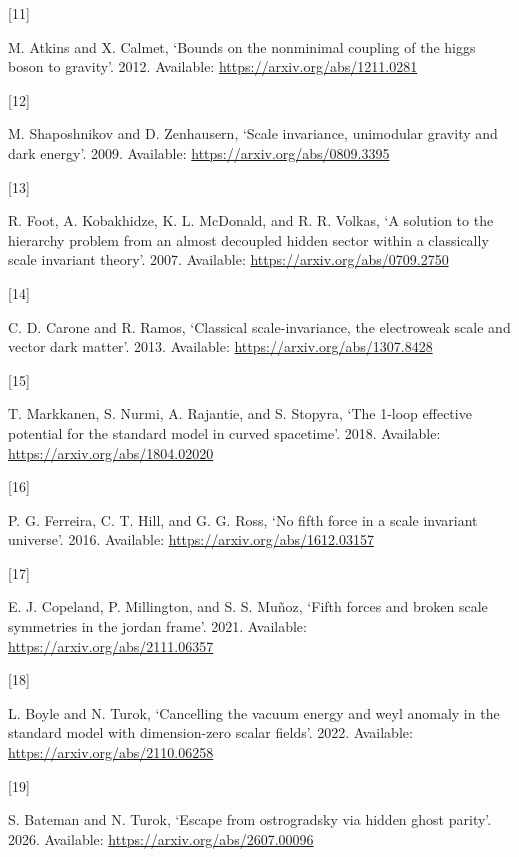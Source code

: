 \documentclass[
]{article}
\newlength{\cslhangindent}
\newlength{\csllabelwidth}
\newenvironment{CSLReferences}[2] %
 {\begin{list}{}{%
  \setlength{\itemindent}{0pt}
  \setlength{\leftmargin}{0pt}
  \setlength{\parsep}{0pt}
  \ifodd #1
   \setlength{\leftmargin}{\cslhangindent}
   \setlength{\itemindent}{-1\cslhangindent}
  \fi
  \setlength{\itemsep}{#2\baselineskip}}}
 {\end{list}}
\newcommand{\CSLLeftMargin}[1]{\parbox[t]{\csllabelwidth}{\strut#1\strut}}
\newcommand{\CSLRightInline}[1]{\parbox[t]{\linewidth - \csllabelwidth}{\strut#1\strut}}
\begin{document}
\begin{CSLReferences}{0}{0}
\CSLLeftMargin{{[}11{]} }%
\CSLRightInline{M. Atkins and X. Calmet, {`Bounds on the nonminimal
coupling of the higgs boson to gravity'}. 2012. Available:
\url{https://arxiv.org/abs/1211.0281}}

\CSLLeftMargin{{[}12{]} }%
\CSLRightInline{M. Shaposhnikov and D. Zenhausern, {`Scale invariance,
unimodular gravity and dark energy'}. 2009. Available:
\url{https://arxiv.org/abs/0809.3395}}

\CSLLeftMargin{{[}13{]} }%
\CSLRightInline{R. Foot, A. Kobakhidze, K. L. McDonald, and R. R.
Volkas, {`A solution to the hierarchy problem from an almost decoupled
hidden sector within a classically scale invariant theory'}. 2007.
Available: \url{https://arxiv.org/abs/0709.2750}}

\CSLLeftMargin{{[}14{]} }%
\CSLRightInline{C. D. Carone and R. Ramos, {`Classical scale-invariance,
the electroweak scale and vector dark matter'}. 2013. Available:
\url{https://arxiv.org/abs/1307.8428}}

\CSLLeftMargin{{[}15{]} }%
\CSLRightInline{T. Markkanen, S. Nurmi, A. Rajantie, and S. Stopyra,
{`The 1-loop effective potential for the standard model in curved
spacetime'}. 2018. Available: \url{https://arxiv.org/abs/1804.02020}}

\CSLLeftMargin{{[}16{]} }%
\CSLRightInline{P. G. Ferreira, C. T. Hill, and G. G. Ross, {`No fifth
force in a scale invariant universe'}. 2016. Available:
\url{https://arxiv.org/abs/1612.03157}}

\CSLLeftMargin{{[}17{]} }%
\CSLRightInline{E. J. Copeland, P. Millington, and S. S. Muñoz, {`Fifth
forces and broken scale symmetries in the jordan frame'}. 2021.
Available: \url{https://arxiv.org/abs/2111.06357}}

\CSLLeftMargin{{[}18{]} }%
\CSLRightInline{L. Boyle and N. Turok, {`Cancelling the vacuum energy
and weyl anomaly in the standard model with dimension-zero scalar
fields'}. 2022. Available: \url{https://arxiv.org/abs/2110.06258}}

\CSLLeftMargin{{[}19{]} }%
\CSLRightInline{S. Bateman and N. Turok, {`Escape from ostrogradsky via
hidden ghost parity'}. 2026. Available:
\url{https://arxiv.org/abs/2607.00096}}


\end{CSLReferences}
\end{document}
